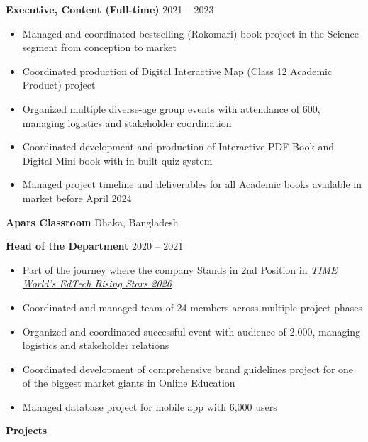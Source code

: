 \documentclass[11pt]{article}
\begin{document}
\vspace{4pt}

\textbf{Executive, Content (Full-time)} \hfill 2021 -- 2023
\begin{itemize}[noitemsep, topsep=0pt, partopsep=0pt, parsep=0pt]
    \item Managed and coordinated bestselling (Rokomari) book project in the Science segment from conception to market
    \item Coordinated production of Digital Interactive Map (Class 12 Academic Product) project
    \item Organized multiple diverse-age group events with attendance of 600, managing logistics and stakeholder coordination
    \item Coordinated development and production of Interactive PDF Book and Digital Mini-book with in-built quiz system
    \item Managed project timeline and deliverables for all Academic books available in market before April 2024
\end{itemize}

\vspace{4pt}

\textbf{Apars Classroom} \hfill Dhaka, Bangladesh

\textbf{Head of the Department} \hfill 2020 -- 2021
\begin{itemize}[noitemsep, topsep=0pt, partopsep=0pt, parsep=0pt]
    \item Part of the journey where the company Stands in 2nd Position in \href{https://time.com/article/2026/07/22/worlds-top-edtech-companies-2026/}{\textit{TIME World's EdTech Rising Stars 2026}}
    \item Coordinated and managed team of 24 members across multiple project phases
    \item Organized and coordinated successful event with audience of 2,000, managing logistics and stakeholder relations
    \item Coordinated development of comprehensive brand guidelines project for one of the biggest market giants in Online Education
    \item Managed database project for mobile app with 6,000 users
\end{itemize}

\vspace{4pt}

\begin{center}
    \textbf{Projects}
\end{center}
\end{document}
